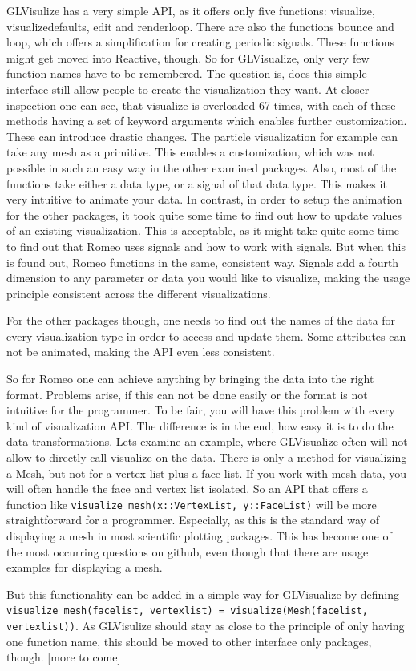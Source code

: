 GLVisulize has a very simple API, as it offers only five functions: visualize, visualizedefaults, edit and renderloop.
There are also the functions bounce and loop, which offers a simplification for creating periodic signals.
These functions might get moved into Reactive, though.
So for GLVisualize, only very few function names have to be remembered.
The question is, does this simple interface still allow people to create the visualization they want.
At closer inspection one can see, that visualize is overloaded 67 times, with each of these methods having a set of keyword arguments which enables further customization.
These can introduce drastic changes. The particle visualization for example can take any mesh as a primitive. This enables a customization, which was not possible in such an easy way in the other examined packages.
Also, most of the functions take either a data type, or a signal of that data type.
This makes it very intuitive to animate your data. 
In contrast, in order to setup the animation for the other packages, it took quite some time to find out how to update values of an existing visualization. This is acceptable, as it might take quite some time to find out that Romeo uses signals and how to work with signals.
But when this is found out, Romeo functions in the same, consistent way. Signals add a fourth dimension to any parameter or data you would like to visualize, making the usage principle consistent across the different visualizations.

For the other packages though, one needs to find out the names of the data for every visualization type in order to access and update them. Some attributes can not be animated, making the API even less consistent.

So for Romeo one can achieve anything by bringing the data into the right format.
Problems arise, if this can not be done easily or the format is not intuitive for the programmer.
To be fair, you will have this problem with every kind of visualization API. 
The difference is in the end, how easy it is to do the data transformations. 
Lets examine an example, where GLVisualize often will not allow to directly call visualize on the data.
There is only a method for visualizing a Mesh, but not for a vertex list plus a face list. If you work with mesh data, you will often handle the face and vertex list isolated.
So an API that offers a function like \texttt{visualize\_mesh(x::VertexList, y::FaceList)} will be more straightforward for a programmer.
Especially, as this is the standard way of displaying a mesh in most scientific plotting packages. This has become one of the most occurring questions on github, even though that there are usage examples for displaying a mesh.

But this functionality can be added in a simple way for GLVisualize by defining \texttt{visualize\_mesh(facelist, vertexlist) = visualize(Mesh(facelist, vertexlist))}.
As GLVisulize should stay as close to the principle of only having one function name, this should be moved to other interface only packages, though.
[more to come]